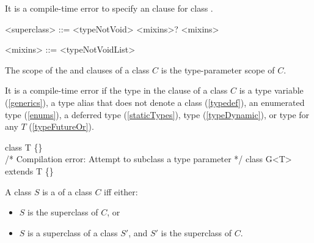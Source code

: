 \documentclass[makeidx]{article}
\begin{document}
\LMHash{}%
It is a compile-time error to specify an \EXTENDS{} clause
for class .

\begin{grammar}
<superclass> ::= \EXTENDS{} <typeNotVoid> <mixins>?
    \alt <mixins>

<mixins> ::= \WITH{} <typeNotVoidList>
\end{grammar}


\LMHash{}%
The scope of the \EXTENDS{} and \WITH{} clauses of a class $C$ is the type-parameter scope of $C$.

\LMHash{}%
It is a compile-time error if the type in the \EXTENDS{} clause of a class $C$ is
a type variable (\ref{generics}), a type alias that does not denote a class (\ref{typedef}),
an enumerated type (\ref{enums}),
a deferred type (\ref{staticTypes}), type \DYNAMIC{} (\ref{typeDynamic}),
or type  for any $T$ (\ref{typeFutureOr}).



\begin{dartCode}
class T \{\}
\\
/* Compilation error: Attempt to subclass a type parameter */
class G<T> extends T \{\}
\end{dartCode}

\LMHash{}%
A class $S$ is a  of a class $C$ if{}f either:
\begin{itemize}
\item $S$ is the superclass of $C$, or
\item $S$ is a superclass of a class $S'$,
and $S'$ is the superclass of $C$.
\end{itemize}
\end{document}
